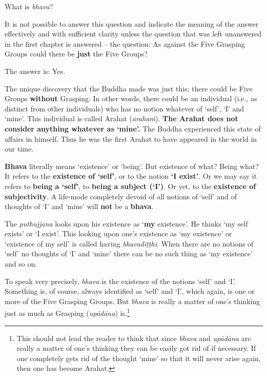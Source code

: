 What is \emph{bhava}?

It is not possible to answer this question and indicate the meaning of the answer effectively and with sufficient clarity unless the question that was left unanswered in the first chapter is answered -- the question: As against the Five Grasping Groups could there be \textbf{just} the Five Groups?

The answer is: Yes.

The unique discovery that the Buddha made was just this: there could be Five Groups \textbf{without} Grasping. In other words, there could be an individual (i.e., as distinct from other individuals) who has no notion whatever of `self', `I' and `mine'. This individual is called Arahat (\emph{arahaṁ}). \textbf{The Arahat does not consider anything whatever as `mine'.} The Buddha experienced this state of affairs in himself. Thus he was the first Arahat to have appeared in the world in our time.

\textbf{Bhava} literally means `existence' or `being'. But existence of what? Being what? It refers to the \textbf{existence of `self'}, or to the notion \textbf{`I exist'}. Or we may say it refers to \textbf{being a `self'}, to \textbf{being a subject (`I')}. Or yet, to the \textbf{existence of subjectivity}. A life-mode completely devoid of all notions of `self' and of thoughts of `I' and `mine' will \textbf{not} be a \textbf{bhava}.

The \emph{puthujjana} looks upon his existence as `\textbf{my} existence'. He thinks `my self exists' or `I exist'. This looking upon one's existence as `my existence' or `existence of my self' is called having \emph{bhavadiṭṭhi}. When there are no notions of `self' no thoughts of `I' and `mine' there can be no such thing as `my existence' and so on.

To speak very precisely, \emph{bhava} is the existence of the notions `self' and `I'. Something is, of course, always identified as `self' and `I', which again, is one or more of the Five Grasping Groups. But \emph{bhava} is really a matter of one's thinking just as much as Grasping (\emph{upādāna}) is.\footnote{This should not lead the reader to think that since \emph{bhava} and \emph{upādāna} are really a matter of one's thinking they can be easily got rid of if necessary. If one completely gets rid of the thought `mine' so that it will never arise again, then one has become Arahat.}

